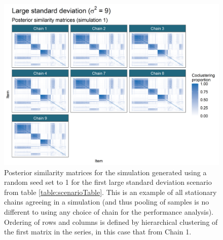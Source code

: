 \documentclass[]{article}
\begin{document}
\begin{figure} %
	\centering
	\includegraphics[scale=0.65]{./Images/Simulations/PSMs/large_standard_deviation_3Sim1.png}
	\caption{Posterior similarity matrices for the simulation generated using a random seed set to 1 for the first large standard deviation scenario from table \ref{table:scenarioTable}. This is an example of all stationary chains agreeing in a simulation (and thus pooling of samples is no different to using any choice of chain for the performance analysis). Ordering of rows and columns is defined by hierarchical clustering of the first matrix in the series, in this case that from Chain 1.}
	\label{fig:simPSMsAgreeExample}
\end{figure}
\end{document}
